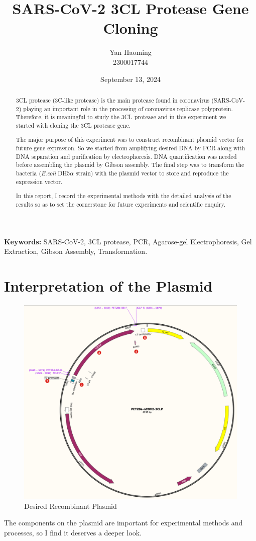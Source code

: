 \documentclass{article}
\title{SARS-CoV-2 3CL Protease Gene Cloning}
\author{Yan Haoming\\2300017744}
\date{September 13, 2024}
\begin{document}
\maketitle
\begin{abstract}
    3CL protease (3C-like protease) is the main protease found in coronavirus (SARS-CoV-2) playing an important role in the processing of coronavirus replicase polyprotein\cite{websiteKey}.
    Therefore, it is meaningful to study the 3CL protease and in this experiment we started with cloning the 3CL protease gene.
    
    The major purpose of this experiment was to construct recombinant plasmid vector for future gene expression.
    So we started from amplifying desired DNA by PCR along with DNA separation and purification by electrophoresis.
    DNA quantification was needed before assembling the plasmid by Gibson assembly.
    The final step was to transform the bacteria (\textit{E.coli} DH5$\alpha$ strain) with the plasmid vector to store and reproduce the expression vector.

    In this report, I record the experimental methods with the detailed analysis of the results so as to set the cornerstone for future experiments and scientific enquiry.
\end{abstract}
\textbf{Keywords:} SARS-CoV-2, 3CL protease, PCR, Agarose-gel Electrophoresis, Gel Extraction, Gibson Assembly, Transformation.
\section{Interpretation of the Plasmid}
    \begin{figure}
    \centering
    \includegraphics[width=0.75\linewidth]{../Figures/plasmid.png}
    \caption{Desired Recombinant Plasmid}
    \label{Desired Recombinant Plasmid}
    \end{figure}
    The components on the plasmid are important for experimental methods and processes, so I find it deserves a deeper look.
    
\end{document}
